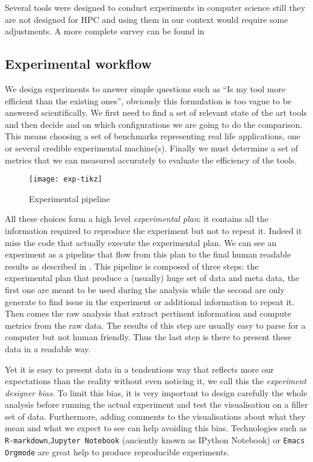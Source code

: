 Several tools were designed to conduct experiments in computer science still
they are not designed for \gls{HPC} and using them in our context would
require some adjustments. A more complete survey can be found
in~\cite[Chapter~3, p17-19]{Stanisic15Reproducible}

\subsection{Experimental workflow}

We design experiments to answer simple questions such as ``Is my tool more
efficient than the existing ones'', obviously this formulation is too vague to
be answered scientifically. We first need to find a set of relevant state of
the art tools and then decide and on which configurations we are going to do
the comparison. This means choosing a set of benchmarks representing real life
applications, one or several credible experimental machine(s). Finally we must
determine a set of metrics that we can measured accurately to evaluate the
efficiency of the tools.

\begin{figure}[htb]
    \centering
    \texttt{[image: exp-tikz]}
    \caption{Experimental pipeline}
    \label{fig:exp-pipeline}
\end{figure}

All these choices form a high level \emph{experimental plan}: it contains all
the information required to reproduce the experiment but not to repeat it.
Indeed it miss the code that actually execute the experimental plan.
We can see an experiment as a pipeline that flow from this plan to the final
human readable results as described in . This pipeline is
composed of three steps: the experimental plan that produce a (usually) huge
set of data and meta data, the first one are meant to be used during the
analysis while the second are only generate to find issue in the experiment or
additional information to repeat it. Then comes the raw analysis that extract
pertinent information and compute metrics from the raw data. The results of
this step are usually easy to parse for a computer but not human friendly.
Thus the last step is there to present these data in a readable way.

Yet it is easy to present data in a tendentious way that reflects more our
expectations than the reality without even noticing it, we call this the
\emph{experiment designer bias}. To limit this bias,
it is very important to design carefully the whole analysis before running the
actual experiment and test the visualisation on a filler set of data.
Furthermore, adding comments to the visualisations about what they mean and
what we expect to see can help avoiding this bias. Technologies such as
\texttt{R-markdown},\texttt{Jupyter Notebook} (anciently known as IPython
Notebook) or \texttt{Emacs Orgmode} are great help to produce reproducible
experiments.

